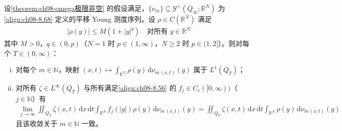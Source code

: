 \documentclass[../../main.tex]{subfiles}%
\begin{document}
\begin{lemma}[平移测度的积分收敛]\label{lemma:ch08-积分收敛}
设\cref{theorem:ch08-omega极限非空} 的假设满足，$\{\nu_m\}\subseteq\mathcal{Y}^+(Q_\infty;\mathbb{R}^N)$ 为\eqref{align:ch08-8.68} 定义的平移 Young 测度序列。设 $\rho\in C(\mathbb{R}^N)$ 满足
\begin{align*}
|\rho(y)|\leqslant M(1+|y|^q)\quad\text{对所有 }y\in\mathbb{R}^N
\end{align*}
其中 $M>0$，$q\in(0,p)$（$N=1$ 时 $p\in(1,\infty)$，$N\geqslant2$ 时 $p\in(1,2]$）。则对每个 $T\in(0,\infty)$：
\begin{enumerate}[(i)]
\item\label{item:ch08-intconv-i} 对每个 $m\in\mathbb{N}$，映射 $(x,t)\mapsto\int_{\mathbb{R}^N}\rho(y)\,\mathrm{d}\nu_{m\,(x,t)}(y)$ 属于 $L^1(Q_T)$；
\item\label{item:ch08-intconv-ii} 对所有 $\zeta\in L^\infty(Q_T)$ 与所有满足\eqref{align:ch08-8.56} 的 $f_j\in C_c([0,\infty))$（$j\in\mathbb{N}$）有
\begin{align}
\lim_{j\to\infty}\iint_{Q_T}\zeta(x,t)\,\mathrm{d}x\,\mathrm{d}t\int_{\mathbb{R}^N}f_j(|y|)\rho(y)\,\mathrm{d}\nu_{m\,(x,t)}(y)
=\iint_{Q_T}\zeta(x,t)\,\mathrm{d}x\,\mathrm{d}t\int_{\mathbb{R}^N}\rho(y)\,\mathrm{d}\nu_{m\,(x,t)}(y) \label{align:ch08-8.76}
\end{align}
且该收敛关于 $m\in\mathbb{N}$ 一致。
\end{enumerate}
\end{lemma}
\end{document}
